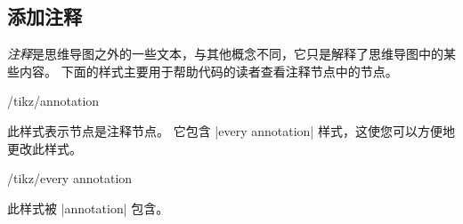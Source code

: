 \subsection{添加注释}


\emph{注释}是思维导图之外的一些文本，与其他概念不同，它只是解释了思维导图中的某些内容。 下面的样式主要用于帮助代码的读者查看注释节点中的节点。

\begin{stylekey}{/tikz/annotation}

    此样式表示节点是注释节点。 它包含 |every annotation| 样式，这使您可以方便地更改此样式。
\begin{codeexample}[preamble={\usetikzlibrary{mindmap}}]
\end{codeexample}
    \begin{stylekey}{/tikz/every annotation}

        此样式被 |annotation| 包含。
    \end{stylekey}
\end{stylekey}



